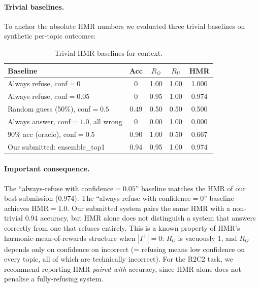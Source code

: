 \documentclass[11pt,a4paper]{article}
\newcommand{\HMR}{\textsc{HMR}}
\begin{document}
\paragraph{Trivial baselines.} To anchor the absolute \HMR{} numbers
we evaluated three trivial baselines on synthetic per-topic outcomes:

\begin{table}[h]
\centering
\caption{Trivial \HMR{} baselines for context.}
\label{tab:trivial}
\begin{tabular}{lcccc}
\toprule
Baseline & Acc & $R_O$ & $R_U$ & \HMR \\
\midrule
Always refuse, conf$=0$         & 0    & 1.00 & 1.00 & 1.000 \\
Always refuse, conf$=0.05$      & 0    & 0.95 & 1.00 & 0.974 \\
Random guess (50\%), conf$=0.5$ & 0.49 & 0.50 & 0.50 & 0.500 \\
Always answer, conf$=1.0$, all wrong & 0  & 0.00 & 1.00 & 0.000 \\
90\% acc (oracle), conf$=0.5$   & 0.90 & 1.00 & 0.50 & 0.667 \\
\midrule
Our submitted: ensemble\_top1   & 0.94 & 0.95 & 1.00 & 0.974 \\
\bottomrule
\end{tabular}
\end{table}

\paragraph{Important consequence.} The ``always-refuse with
confidence$=0.05$'' baseline matches the \HMR{} of our best submission
(0.974). The ``always-refuse with confidence$=0$'' baseline achieves
\HMR{}$=1.0$. Our submitted system pairs the same \HMR{} with a
non-trivial 0.94 accuracy, but \HMR{} alone does not distinguish a
system that answers correctly from one that refuses entirely. This
is a known property of \HMR{}'s harmonic-mean-of-rewards structure when
$|I^+|=0$: $R_U$ is vacuously 1, and $R_O$ depends only on confidence
on incorrect (= refusing means low confidence on every topic, all of
which are technically incorrect). For the R2C2 task, we recommend
reporting \HMR{} \emph{paired with} accuracy, since \HMR{} alone
does not penalise a fully-refusing system.
\end{document}
